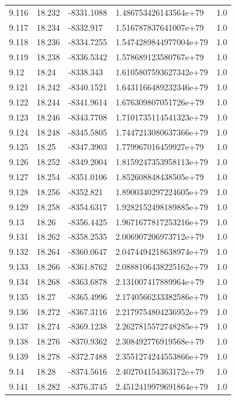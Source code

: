 \begin{tabular}{lllll}
9.116 & 18.232 & -8331.1088 & 1.486753426143564e+79 & 1.0 \\
9.117 & 18.234 & -8332.917 & 1.516787837641007e+79 & 1.0 \\
9.118 & 18.236 & -8334.7255 & 1.5474289844977004e+79 & 1.0 \\
9.119 & 18.238 & -8336.5342 & 1.578689123580767e+79 & 1.0 \\
9.12 & 18.24 & -8338.343 & 1.6105807593627342e+79 & 1.0 \\
9.121 & 18.242 & -8340.1521 & 1.6431166489232346e+79 & 1.0 \\
9.122 & 18.244 & -8341.9614 & 1.676309807051726e+79 & 1.0 \\
9.123 & 18.246 & -8343.7708 & 1.7101735114541323e+79 & 1.0 \\
9.124 & 18.248 & -8345.5805 & 1.7447213080637366e+79 & 1.0 \\
9.125 & 18.25 & -8347.3903 & 1.779967016459927e+79 & 1.0 \\
9.126 & 18.252 & -8349.2004 & 1.8159247353958113e+79 & 1.0 \\
9.127 & 18.254 & -8351.0106 & 1.852608848438505e+79 & 1.0 \\
9.128 & 18.256 & -8352.821 & 1.8900340297224605e+79 & 1.0 \\
9.129 & 18.258 & -8354.6317 & 1.9282152498189885e+79 & 1.0 \\
9.13 & 18.26 & -8356.4425 & 1.9671677817253216e+79 & 1.0 \\
9.131 & 18.262 & -8358.2535 & 2.006907206973712e+79 & 1.0 \\
9.132 & 18.264 & -8360.0647 & 2.0474494218638974e+79 & 1.0 \\
9.133 & 18.266 & -8361.8762 & 2.0888106438225162e+79 & 1.0 \\
9.134 & 18.268 & -8363.6878 & 2.131007417889964e+79 & 1.0 \\
9.135 & 18.27 & -8365.4996 & 2.1740566233382586e+79 & 1.0 \\
9.136 & 18.272 & -8367.3116 & 2.2179754804236952e+79 & 1.0 \\
9.137 & 18.274 & -8369.1238 & 2.2627815572748285e+79 & 1.0 \\
9.138 & 18.276 & -8370.9362 & 2.308492776919568e+79 & 1.0 \\
9.139 & 18.278 & -8372.7488 & 2.3551274244553866e+79 & 1.0 \\
9.14 & 18.28 & -8374.5616 & 2.402704154363172e+79 & 1.0 \\
9.141 & 18.282 & -8376.3745 & 2.4512419979691864e+79 & 1.0 \\

\end{tabular}
